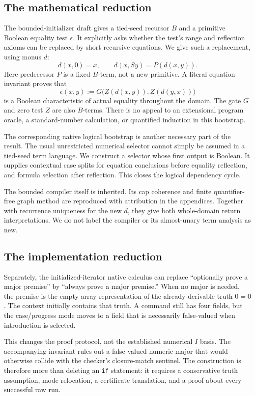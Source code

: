 \subsection{The mathematical reduction}
The bounded-initializer draft gives a tied-seed recursor $B$ and a
primitive Boolean equality test $\epsilon$. It explicitly asks whether
the test's range and reflection axioms can be replaced by short recursive
equations.\cite{bounded} We give such a replacement, using monus $d$:
\[
 d(x,0)=x,\qquad d(x,Sy)=P(d(x,y)).
\]
Here predecessor $P$ is a fixed $B$-term, not a new primitive. A literal
equation invariant proves that
\[
 \epsilon(x,y):=G\bigl(Z(d(x,y)),Z(d(y,x))\bigr)
\]
is a Boolean characteristic of actual equality throughout the domain.
The gate $G$ and zero test $Z$ are also $B$-terms. There is no appeal to
an extensional program oracle, a standard-number calculation, or
quantified induction in this bootstrap.

The corresponding native logical bootstrap is another necessary part of
the result. The usual unrestricted numerical selector cannot simply be
assumed in a tied-seed term language. We construct a selector whose first
output is Boolean. It supplies contextual case splits for equation
conclusions before equality reflection, and formula selection after
reflection. This closes the logical dependency cycle.

The bounded compiler itself is inherited. Its cap coherence and finite
quantifier-free graph method are reproduced with attribution in the
appendices. Together with recurrence uniqueness for the new $d$, they
give both whole-domain return interpretations. We do not label the
compiler or its almost-unary term analysis as new.

\subsection{The implementation reduction}
Separately, the initialized-iterator native calculus can replace
``optionally prove a major premise'' by ``always prove a major premise.''
When no major is needed, the premise is the empty-array representation of
the already derivable truth $0=0$. The context initially contains that
truth. A command still has four fields, but the case/progress mode moves
to a field that is necessarily false-valued when introduction is selected.

This changes the proof protocol, not the established numerical $I$
basis. The accompanying invariant rules out a false-valued numeric major
that would otherwise collide with the checker's closure-match sentinel.
The construction is therefore more than deleting an \texttt{if} statement:
it requires a conservative truth assumption, mode relocation, a
certificate translation, and a proof about every successful raw run.

